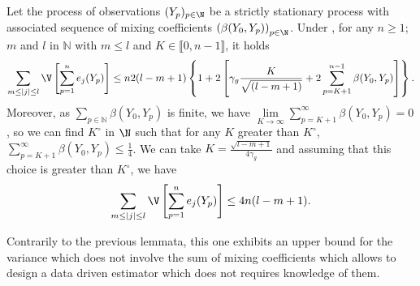 \begin{lm}\label{LM_DEPENDENTDATA_VARIANCEBOUNDIII}
Let the process of observations $(Y_{p})_{p \in \N}$ be a strictly stationary process with associated sequence of mixing coefficients $\left(\beta(Y_{0}, Y_{p})\right)_{p \in \N}$.
Under , for any $n \geq 1$; $m$ and $l$ in $\mathds{N}$ with $m \leq l$ and $K \in \llbracket 0, n-1\rrbracket$, it holds
\[\sum\limits_{m \leq \vert j \vert \leq l} \V\left[\sum\limits_{p = 1}^{n} e_{j}(Y_{p})\right] \leq n 2 (l-m+1) \left\{1 + 2\left[\gamma_{g} \frac{K}{\sqrt{(l-m+1)}} + 2 \sum\limits_{p = K + 1}^{n - 1} \beta(Y_{0}, Y_{p})\right]\right\}.\]
Moreover, as $\sum\limits_{p \in \mathds{N}} \beta(Y_{0}, Y_{p})$ is finite, we have $\lim\limits_{K \rightarrow \infty} \sum\limits_{p = K + 1}^{\infty} \beta(Y_{0}, Y_{p}) = 0$, so we can find $K^{\circ}$ in $\N$ such that for any $K$ greater than $K^{\circ}$, $\sum\limits_{p = K + 1}^{\infty} \beta(Y_{0}, Y_{p}) \leq \frac{1}{4}$.
We can take $K = \frac{\sqrt{l - m + 1}}{4 \gamma_{g}}$ and assuming that this choice is greater than $K^{\circ}$, we have
\[\sum\limits_{m \leq \vert j \vert \leq l} \V\left[\sum\limits_{p = 1}^{n} e_{j}(Y_{p})\right] \leq 4 n (l-m+1).\]
\end{lm}

Contrarily to the previous lemmata, this one exhibits an upper bound for the variance which does not involve the sum of mixing coefficients which allows to design a data driven estimator which does not requires knowledge of them.


